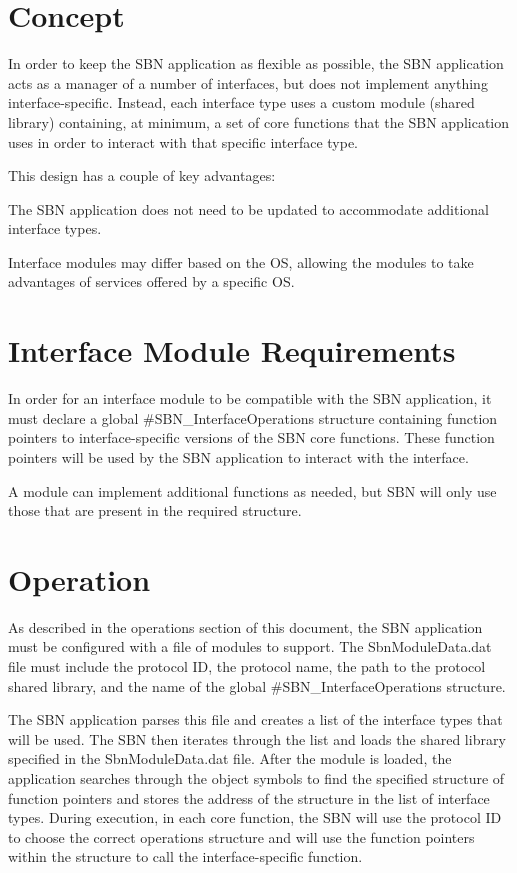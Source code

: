 \section*{Concept }

In order to keep the S\-B\-N application as flexible as possible, the S\-B\-N application acts as a manager of a number of interfaces, but does not implement anything interface-\/specific. Instead, each interface type uses a custom module (shared library) containing, at minimum, a set of core functions that the S\-B\-N application uses in order to interact with that specific interface type.

This design has a couple of key advantages\-: 
\begin{DoxyItemize}
\item The S\-B\-N application does not need to be updated to accommodate additional interface types.  
\item Interface modules may differ based on the O\-S, allowing the modules to take advantages of services offered by a specific O\-S.  
\end{DoxyItemize}

\section*{Interface Module Requirements }

In order for an interface module to be compatible with the S\-B\-N application, it must declare a global \#\-S\-B\-N\-\_\-\-Interface\-Operations structure containing function pointers to interface-\/specific versions of the S\-B\-N core functions. These function pointers will be used by the S\-B\-N application to interact with the interface.

A module can implement additional functions as needed, but S\-B\-N will only use those that are present in the required structure.

\section*{Operation }

As described in the operations section of this document, the S\-B\-N application must be configured with a file of modules to support. The Sbn\-Module\-Data.\-dat file must include the protocol I\-D, the protocol name, the path to the protocol shared library, and the name of the global \#\-S\-B\-N\-\_\-\-Interface\-Operations structure.

The S\-B\-N application parses this file and creates a list of the interface types that will be used. The S\-B\-N then iterates through the list and loads the shared library specified in the Sbn\-Module\-Data.\-dat file. After the module is loaded, the application searches through the object symbols to find the specified structure of function pointers and stores the address of the structure in the list of interface types. During execution, in each core function, the S\-B\-N will use the protocol I\-D to choose the correct operations structure and will use the function pointers within the structure to call the interface-\/specific function.


